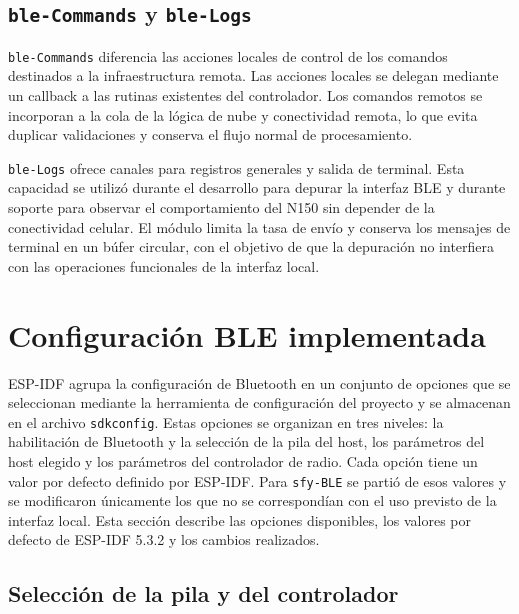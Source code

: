\subsection{\texttt{ble-Commands} y \texttt{ble-Logs}}

\texttt{ble-Commands} diferencia las acciones locales de control de los comandos destinados a la infraestructura remota. Las acciones locales se delegan mediante un callback a las rutinas existentes del controlador. Los comandos remotos se incorporan a la cola de la lógica de nube y conectividad remota, lo que evita duplicar validaciones y conserva el flujo normal de procesamiento.

\texttt{ble-Logs} ofrece canales para registros generales y salida de terminal. Esta capacidad se utilizó durante el desarrollo para depurar la interfaz BLE y durante soporte para observar el comportamiento del N150 sin depender de la conectividad celular. El módulo limita la tasa de envío y conserva los mensajes de terminal en un búfer circular, con el objetivo de que la depuración no interfiera con las operaciones funcionales de la interfaz local.


\section{Configuración BLE implementada}
\label{sec:configuracion_ble}

ESP-IDF agrupa la configuración de Bluetooth en un conjunto de opciones que se seleccionan mediante la herramienta de configuración del proyecto y se almacenan en el archivo \texttt{sdkconfig}. Estas opciones se organizan en tres niveles: la habilitación de Bluetooth y la selección de la pila del host, los parámetros del host elegido y los parámetros del controlador de radio. Cada opción tiene un valor por defecto definido por ESP-IDF. Para \texttt{sfy-BLE} se partió de esos valores y se modificaron únicamente los que no se correspondían con el uso previsto de la interfaz local. Esta sección describe las opciones disponibles, los valores por defecto de ESP-IDF 5.3.2 y los cambios realizados.

\subsection{Selección de la pila y del controlador}
\label{subsec:config_pila}


